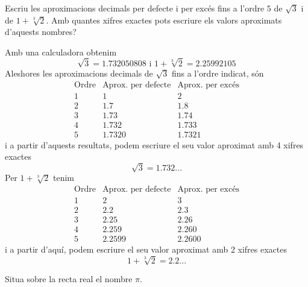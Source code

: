 \begin{exercici}
Escriu les aproximacions decimals per defecte i per excés fins a l’ordre 
$5$ de $\sqrt{3}$ i de $1+\sqrt[3]{2}$. Amb quantes
xifres exactes pots escriure els valors aproximats d’aquests nombres?

\end{exercici}

\begin{solucio}
Amb una calculadora obtenim%
\begin{equation*}
\sqrt{3}=1.732050808\text{ \ \ i \ \ }1+\sqrt[3]{2}=2.25992105
\end{equation*}%
Aleshores les aproximacions decimals de $\sqrt{3}$ fins a l’ordre indicat,
són%
\begin{equation*}
\begin{array}{c|c|c}
\text{Ordre} & \text{Aprox. per defecte} & \text{Aprox. per excés} \\ \hline
1 & 1 & 2 \\ 
2 & 1.7 & 1.8 \\ 
3 & 1.73 & 1.74 \\ 
4 & 1.732 & 1.733 \\ 
5 & 1.7320 & 1.7321%
\end{array}%
\end{equation*}
i a partir d’aquests resultats, podem escriure el seu valor aproximat amb 4
xifres exactes%
\begin{equation*}
\sqrt{3}=1.732...
\end{equation*}%
Per $1+\sqrt[3]{2}$ tenim%
\begin{equation*}
\begin{array}{c|c|c}
\text{Ordre} & \text{Aprox. per defecte} & \text{Aprox. per excés} \\ \hline
1 & 2 & 3 \\ 
2 & 2.2 & 2.3 \\ 
3 & 2.25 & 2.26 \\ 
4 & 2.259 & 2.260 \\ 
5 & 2.2599 & 2.2600%
\end{array}%
\end{equation*}
i a partir d’aquí, podem escriure el seu valor aproximat amb 2 xifres
exactes%
\begin{equation*}
1+\sqrt[3]{2}=2.2...
\end{equation*}
\end{solucio}

\begin{exercici}
Situa sobre la recta real el nombre $\pi $.

\end{exercici}


